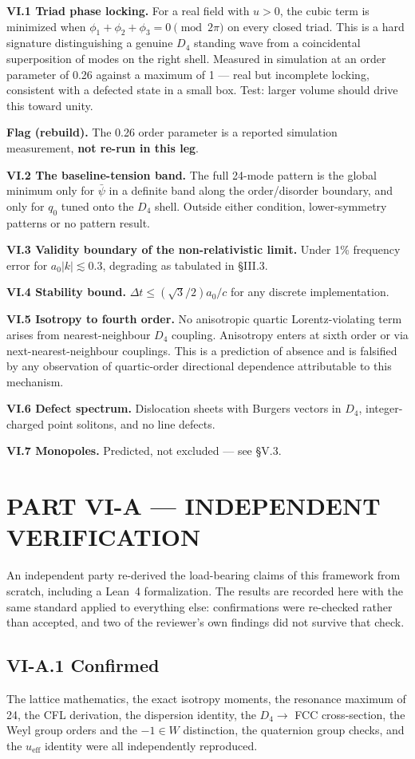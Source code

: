 \documentclass[11pt,a4paper]{article}
\newcommand{\flagbox}[1]{\par\smallskip\noindent\textbf{Flag (rebuild).} #1\par\smallskip}
\begin{document}
\textbf{VI.1 Triad phase locking.} For a real field with $u > 0$, the cubic term is minimized when $\phi_1 + \phi_2 + \phi_3 = 0 \pmod{2\pi}$ on every closed triad. This is a hard signature distinguishing a genuine $D_4$ standing wave from a coincidental superposition of modes on the right shell. Measured in simulation at an order parameter of 0.26 against a maximum of 1 --- real but incomplete locking, consistent with a defected state in a small box. Test: larger volume should drive this toward unity.
\flagbox{The 0.26 order parameter is a reported simulation measurement, \textbf{not re-run in this leg}.}

\textbf{VI.2 The baseline-tension band.} The full 24-mode pattern is the global minimum only for $\bar{\psi}$ in a definite band along the order/disorder boundary, and only for $q_0$ tuned onto the $D_4$ shell. Outside either condition, lower-symmetry patterns or no pattern result.

\textbf{VI.3 Validity boundary of the non-relativistic limit.} Under 1\% frequency error for $a_0|k| \lesssim 0.3$, degrading as tabulated in \S III.3.

\textbf{VI.4 Stability bound.} $\Delta t \leq (\sqrt{3}/2)a_0/c$ for any discrete implementation.

\textbf{VI.5 Isotropy to fourth order.} No anisotropic quartic Lorentz-violating term arises from nearest-neighbour $D_4$ coupling. Anisotropy enters at sixth order or via next-nearest-neighbour couplings. This is a prediction of absence and is falsified by any observation of quartic-order directional dependence attributable to this mechanism.

\textbf{VI.6 Defect spectrum.} Dislocation sheets with Burgers vectors in $D_4$, integer-charged point solitons, and no line defects.

\textbf{VI.7 Monopoles.} Predicted, not excluded --- see \S V.3.

\section{PART VI-A --- INDEPENDENT VERIFICATION}
An independent party re-derived the load-bearing claims of this framework from scratch, including a Lean~4 formalization. The results are recorded here with the same standard applied to everything else: confirmations were re-checked rather than accepted, and two of the reviewer's own findings did not survive that check.

\subsection{VI-A.1 Confirmed}
The lattice mathematics, the exact isotropy moments, the resonance maximum of 24, the CFL derivation, the dispersion identity, the $D_4 \to$ FCC cross-section, the Weyl group orders and the $-1 \in W$ distinction, the quaternion group checks, and the $u_{\mathrm{eff}}$ identity were all independently reproduced.
\end{document}
